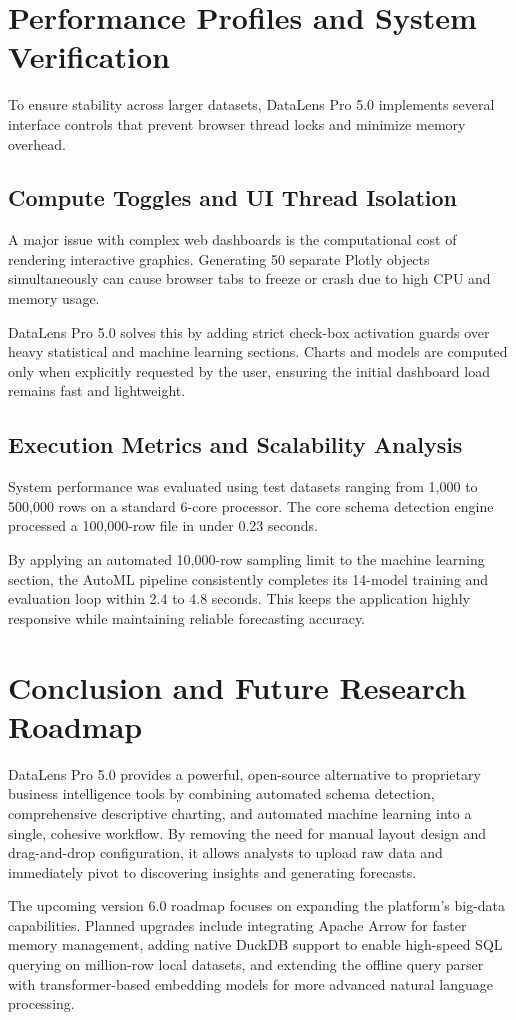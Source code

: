 \documentclass[11pt,a4paper,titlepage]{article}
\begin{document}
\section{Performance Profiles and System Verification}
To ensure stability across larger datasets, DataLens Pro 5.0 implements several interface controls that prevent browser thread locks and minimize memory overhead.

\subsection{Compute Toggles and UI Thread Isolation}
A major issue with complex web dashboards is the computational cost of rendering interactive graphics. Generating 50 separate Plotly objects simultaneously can cause browser tabs to freeze or crash due to high CPU and memory usage. 

DataLens Pro 5.0 solves this by adding strict check-box activation guards over heavy statistical and machine learning sections. Charts and models are computed only when explicitly requested by the user, ensuring the initial dashboard load remains fast and lightweight.

\subsection{Execution Metrics and Scalability Analysis}
System performance was evaluated using test datasets ranging from 1,000 to 500,000 rows on a standard 6-core processor. The core schema detection engine processed a 100,000-row file in under 0.23 seconds. 

By applying an automated 10,000-row sampling limit to the machine learning section, the AutoML pipeline consistently completes its 14-model training and evaluation loop within 2.4 to 4.8 seconds. This keeps the application highly responsive while maintaining reliable forecasting accuracy.

\section{Conclusion and Future Research Roadmap}
DataLens Pro 5.0 provides a powerful, open-source alternative to proprietary business intelligence tools by combining automated schema detection, comprehensive descriptive charting, and automated machine learning into a single, cohesive workflow. By removing the need for manual layout design and drag-and-drop configuration, it allows analysts to upload raw data and immediately pivot to discovering insights and generating forecasts.

The upcoming version 6.0 roadmap focuses on expanding the platform's big-data capabilities. Planned upgrades include integrating Apache Arrow for faster memory management, adding native DuckDB support to enable high-speed SQL querying on million-row local datasets, and extending the offline query parser with transformer-based embedding models for more advanced natural language processing.
\end{document}
